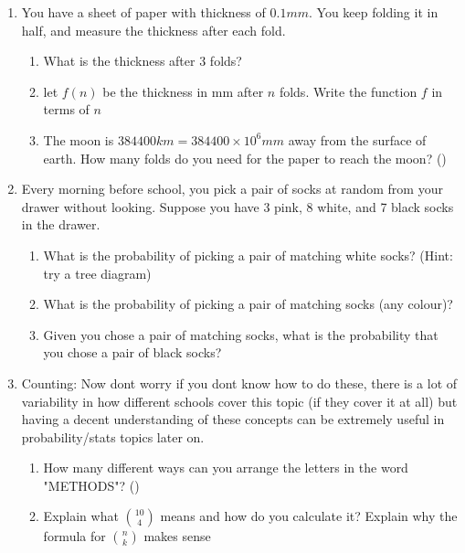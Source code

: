 \documentclass[12pt]{article}
\begin{document}
\begin{enumerate}
    \item You have a sheet of paper with thickness of $0.1mm$. You keep folding it in half, and measure the thickness after each fold.
    \begin{enumerate}
        \item What is the thickness after 3 folds?
        \vspace{2cm}
        \item let $f(n)$ be the thickness in mm after $n$ folds. Write the function $f$ in terms of $n$
        \vspace{3cm}
        \item The moon is $384400 km = 384400 \times 10^{6} mm$ away from the surface of earth. How many folds do you need for the paper to reach the moon? (\faCalculator)
        \vspace{4cm}
    \end{enumerate}

    \item Every morning before school, you pick a pair of socks at random from your drawer without looking. Suppose you have 3 pink, 8 white, and 7 black socks in the drawer.
    \begin{enumerate}
        \item What is the probability of picking a pair of matching white socks? (Hint: try a tree diagram)
        \vspace{3cm}
        \item What is the probability of picking a pair of matching socks (any colour)?
        \vspace{3cm}
        \item Given you chose a pair of matching socks, what is the probability that you chose a pair of black socks?
        \vspace{3cm}
    \end{enumerate}
    \item Counting: Now dont worry if you dont know how to do these, there is a lot of variability in how different schools cover this topic (if they cover it at all) but having a decent understanding of these concepts can be extremely useful in probability/stats topics later on.
    \begin{enumerate}
    \item How many different ways can you arrange the letters in the word "METHODS"? (\faCalculator)
    \vspace{3cm}
    \item Explain what ${10 \choose{4}}$ means and how do you calculate it? Explain why the formula for ${n \choose{k}}$ makes sense
    \vspace{3cm}
    
\end{enumerate}
    
\end{enumerate}
\end{document}
